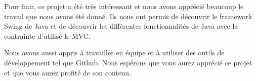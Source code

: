 Pour finir, ce projet a été très intéressant et nous avons apprécié beaucoup le travail que nous avons été donné.
Ils nous ont permis de découvrir le framework Swing de Java et de découvrir les différentes fonctionnalités de Java 
avec la contrainte d'utilisé le MVC. \medskip

Nous avons aussi appris à travailler en équipe et à utiliser des outils de développement tel que Github. 
Nous espérons que vous aurez apprécié ce projet et que vous aurez profité de son contenu.